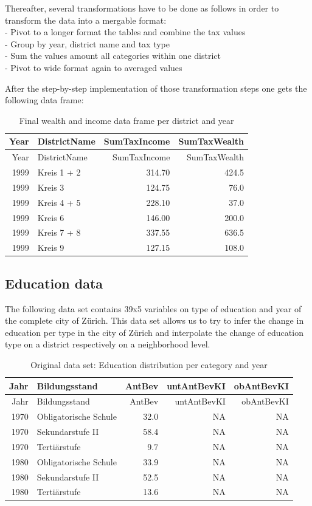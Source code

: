 \documentclass[
]{article}
\begin{document}
Thereafter, several transformations have to be done as follows in order
to transform the data into a mergable format:\\
- Pivot to a longer format the tables and combine the tax values\\
- Group by year, district name and tax type\\
- Sum the values amount all categories within one district\\
- Pivot to wide format again to averaged values

After the step-by-step implementation of those transformation steps one
gets the following data frame:

\begin{longtable}[]{@{}rlrr@{}}
\caption{Final wealth and income data frame per district and
year}\tabularnewline
\toprule
Year & DistrictName & SumTaxIncome & SumTaxWealth\tabularnewline
\midrule
\endfirsthead
\toprule
Year & DistrictName & SumTaxIncome & SumTaxWealth\tabularnewline
\midrule
\endhead
1999 & Kreis 1 + 2 & 314.70 & 424.5\tabularnewline
1999 & Kreis 3 & 124.75 & 76.0\tabularnewline
1999 & Kreis 4 + 5 & 228.10 & 37.0\tabularnewline
1999 & Kreis 6 & 146.00 & 200.0\tabularnewline
1999 & Kreis 7 + 8 & 337.55 & 636.5\tabularnewline
1999 & Kreis 9 & 127.15 & 108.0\tabularnewline
\bottomrule
\end{longtable}

\hypertarget{education-data}{%
\subsection{Education data}\label{education-data}}

The following data set contains 39x5 variables on type of education and
year of the complete city of Zürich. This data set allows us to try to
infer the change in education per type in the city of Zürich and
interpolate the change of education type on a district respectively on a
neighborhood level.

\begin{longtable}[]{@{}rlrrr@{}}
\caption{Original data set: Education distribution per category and
year}\tabularnewline
\toprule
Jahr & Bildungsstand & AntBev & untAntBevKI & obAntBevKI\tabularnewline
\midrule
\endfirsthead
\toprule
Jahr & Bildungsstand & AntBev & untAntBevKI & obAntBevKI\tabularnewline
\midrule
\endhead
1970 & Obligatorische Schule & 32.0 & NA & NA\tabularnewline
1970 & Sekundarstufe II & 58.4 & NA & NA\tabularnewline
1970 & Tertiärstufe & 9.7 & NA & NA\tabularnewline
1980 & Obligatorische Schule & 33.9 & NA & NA\tabularnewline
1980 & Sekundarstufe II & 52.5 & NA & NA\tabularnewline
1980 & Tertiärstufe & 13.6 & NA & NA\tabularnewline
\bottomrule
\end{longtable}
\end{document}
